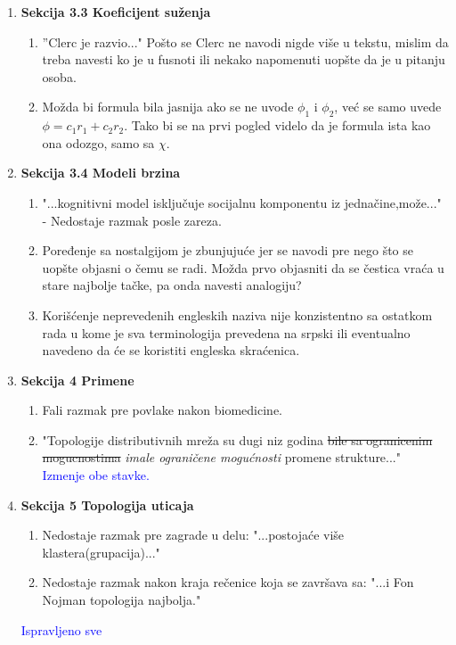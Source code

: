 \documentclass[a4paper]{report}
\newcommand{\odgovor}[1]{\textcolor{blue}{#1}}
\begin{document}
\begin{enumerate}
    \item \textbf{Sekcija 3.3 Koeficijent suženja}
    \begin{enumerate}
        \item ''Clerc je razvio..." Pošto se Clerc ne navodi nigde više u tekstu, mislim da treba navesti ko je u fusnoti ili nekako napomenuti uopšte da je u pitanju osoba.
        \item Možda bi formula bila jasnija ako se ne uvode $\phi_1$ i $\phi_2$, već se samo uvede $\phi=c_1r_1+c_2r_2$. Tako bi se na prvi pogled videlo da je formula ista kao ona odozgo, samo sa $\chi$.
    \end{enumerate}
    
    \item \textbf{Sekcija 3.4 Modeli brzina}
    \begin{enumerate}
        \item "...kognitivni model isključuje socijalnu komponentu iz jednačine,može..." - Nedostaje razmak posle zareza.
        \item Poređenje sa nostalgijom je zbunjujuće jer se navodi pre nego što se uopšte objasni o čemu se radi. Možda prvo objasniti da se čestica vraća u stare najbolje tačke, pa onda navesti analogiju?
        \item Korišćenje neprevedenih engleskih naziva nije konzistentno sa ostatkom rada u kome je sva terminologija prevedena na srpski ili eventualno navedeno da će se koristiti engleska skraćenica.
    \end{enumerate}
    
    \item \textbf{Sekcija 4 Primene}
    \begin{enumerate}
        \item Fali razmak pre povlake nakon biomedicine.
        \item "Topologije distributivnih mreža su dugi niz godina \st{bile sa ogranicenim mogucnostima} \textit{imale ograničene mogućnosti} promene strukture..."\\
        \odgovor{Izmenje obe stavke.}
    \end{enumerate}
    
    \item \textbf{Sekcija 5 Topologija uticaja}
    \begin{enumerate}
        \item Nedostaje razmak pre zagrade u delu: "...postojaće više klastera(grupacija)..."
        \item Nedostaje razmak nakon kraja rečenice koja se završava sa: "...i Fon Nojman topologija najbolja."
    \end{enumerate}
    \odgovor{Ispravljeno sve}
\end{enumerate}
\end{document}
